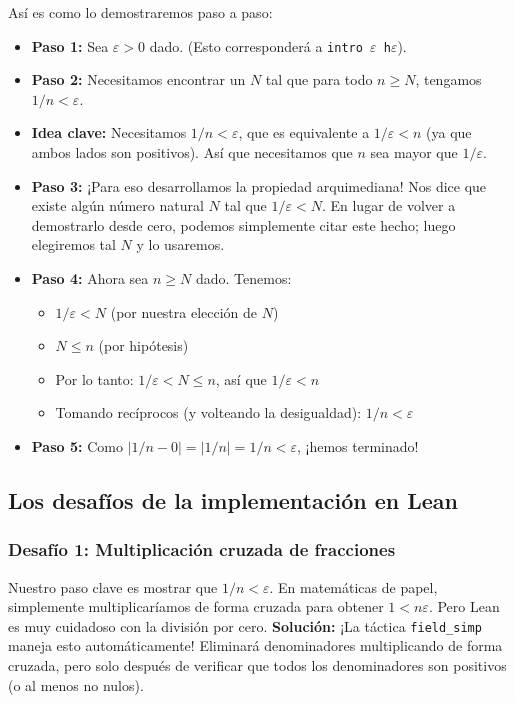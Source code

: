 Así es como lo demostraremos paso a paso:
\begin{itemize}
    \item \textbf{Paso 1:} Sea $\varepsilon > 0$ dado. (Esto corresponderá a \texttt{intro $\varepsilon$ h$\varepsilon$}).
    \item \textbf{Paso 2:} Necesitamos encontrar un $N$ tal que para todo $n \ge N$, tengamos $1/n < \varepsilon$.
    \item \textbf{Idea clave:} Necesitamos $1/n < \varepsilon$, que es equivalente a $1/\varepsilon < n$ (ya que ambos lados son positivos). Así que necesitamos que $n$ sea mayor que $1/\varepsilon$.
    \item \textbf{Paso 3:} ¡Para eso desarrollamos la propiedad arquimediana! Nos dice que existe algún número natural $N$ tal que $1/\varepsilon < N$. En lugar de volver a demostrarlo desde cero, podemos simplemente citar este hecho; luego elegiremos tal $N$ y lo usaremos.
    \item \textbf{Paso 4:} Ahora sea $n \ge N$ dado. Tenemos:
    \begin{itemize}
        \item $1/\varepsilon < N$ (por nuestra elección de $N$)
        \item $N \le n$ (por hipótesis)
        \item Por lo tanto: $1/\varepsilon < N \le n$, así que $1/\varepsilon < n$
        \item Tomando recíprocos (y volteando la desigualdad): $1/n < \varepsilon$
    \end{itemize}
    \item \textbf{Paso 5:} Como $|1/n - 0| = |1/n| = 1/n < \varepsilon$, ¡hemos terminado!
\end{itemize}

\subsection{Los desafíos de la implementación en Lean}

\subsubsection{Desafío 1: Multiplicación cruzada de fracciones}
Nuestro paso clave es mostrar que $1/n < \varepsilon$. En matemáticas de papel, simplemente multiplicaríamos de forma cruzada para obtener $1 < n\varepsilon$. Pero Lean es muy cuidadoso con la división por cero.
\textbf{Solución:} ¡La táctica \texttt{field\_simp} maneja esto automáticamente! Eliminará denominadores multiplicando de forma cruzada, pero solo después de verificar que todos los denominadores son positivos (o al menos no nulos).

